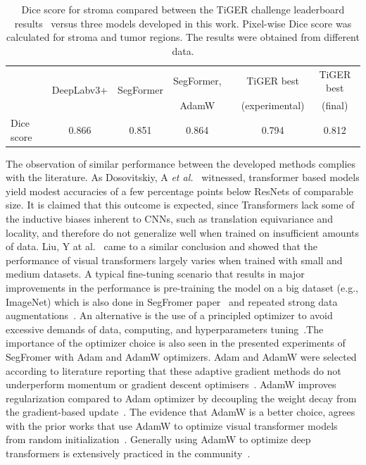 \begin{table}[h!]
    \centering
    \begin{tabular}{ l c c c c c c }
        \hline
         & \multirow{2}{*}{DeepLabv3+} & \multirow{2}{*}{SegFormer} & SegFormer, & & TiGER best & TiGER best\\
         &  &  & AdamW & & (experimental) & (final)\\
        \hline
        Dice score & 0.866 & 0.851 & 0.864 & & 0.794 & 0.812 \\
        \hline
    \end{tabular}
\caption{\label{tab:tissue_compare} Dice score for stroma compared between the TiGER challenge leaderboard
results~\cite{home} versus three models developed in this work.
Pixel-wise Dice score was calculated for stroma and tumor regions. The results were obtained from different data.}
\end{table}

The observation of similar performance between the developed methods complies with the literature. 
As Dosovitskiy, A \textit{et al.}~\cite*{dosovitskiy2020image} witnessed, transformer based models yield
modest accuracies of a few percentage points below ResNets of comparable size. It is claimed
that this outcome is expected, since Transformers lack some of the inductive biases
inherent to CNNs, such as translation equivariance and locality, and therefore do not generalize
well when trained on insufficient amounts of data. Liu, Y at al.~\cite{liu2021efficient} came to
a similar conclusion and showed that the performance of visual transformers largely varies when
trained with small and medium datasets. A typical fine-tuning scenario that results in major
improvements in the performance is pre-training the model on a big dataset (e.g., ImageNet) which
is also done in SegFromer paper~\cite*{xie2021segformer} and repeated strong data augmentations~\cite{touvron2021training}.
An alternative is the use of a principled optimizer to avoid excessive demands of data,
computing, and hyperparameters tuning~\cite*{chen2021vision}.The importance of the optimizer
choice is also seen in the presented experiments of SegFromer with Adam and AdamW optimizers.
Adam and AdamW were selected according to literature reporting that these adaptive gradient
methods do not underperform momentum or gradient descent optimisers~\cite{choi2019empirical}.
AdamW improves regularization compared to Adam optimizer by decoupling the weight decay from the gradient-based update~\cite{loshchilov2017decoupled}.
The evidence that AdamW is a better choice, agrees with the prior works that use AdamW to
optimize visual transformer models from random initialization~\cite{xiao2021early}. Generally using AdamW
to optimize deep transformers is extensively practiced in the community~\cite{anonymous2023applying}.

